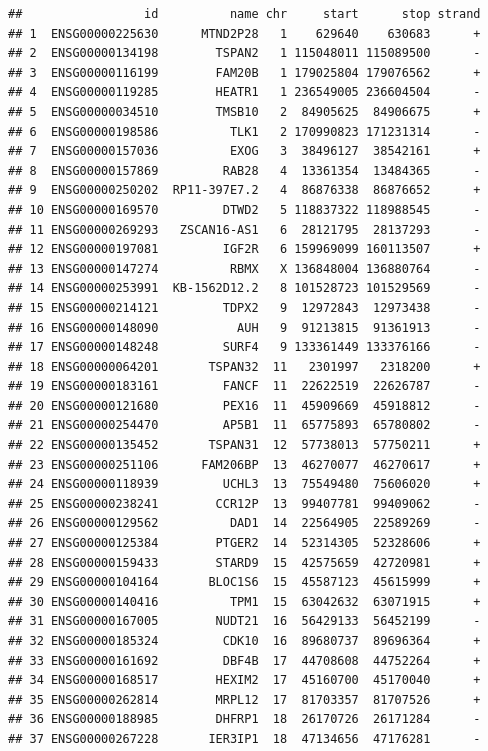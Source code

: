 \documentclass[
]{book}
\begin{document}
\begin{verbatim}
##                 id          name chr     start      stop strand
## 1  ENSG00000225630      MTND2P28   1    629640    630683      +
## 2  ENSG00000134198        TSPAN2   1 115048011 115089500      -
## 3  ENSG00000116199        FAM20B   1 179025804 179076562      +
## 4  ENSG00000119285        HEATR1   1 236549005 236604504      -
## 5  ENSG00000034510        TMSB10   2  84905625  84906675      +
## 6  ENSG00000198586          TLK1   2 170990823 171231314      -
## 7  ENSG00000157036          EXOG   3  38496127  38542161      +
## 8  ENSG00000157869         RAB28   4  13361354  13484365      -
## 9  ENSG00000250202  RP11-397E7.2   4  86876338  86876652      +
## 10 ENSG00000169570         DTWD2   5 118837322 118988545      -
## 11 ENSG00000269293   ZSCAN16-AS1   6  28121795  28137293      -
## 12 ENSG00000197081         IGF2R   6 159969099 160113507      +
## 13 ENSG00000147274          RBMX   X 136848004 136880764      -
## 14 ENSG00000253991  KB-1562D12.2   8 101528723 101529569      -
## 15 ENSG00000214121         TDPX2   9  12972843  12973438      -
## 16 ENSG00000148090           AUH   9  91213815  91361913      -
## 17 ENSG00000148248         SURF4   9 133361449 133376166      -
## 18 ENSG00000064201       TSPAN32  11   2301997   2318200      +
## 19 ENSG00000183161         FANCF  11  22622519  22626787      -
## 20 ENSG00000121680         PEX16  11  45909669  45918812      -
## 21 ENSG00000254470         AP5B1  11  65775893  65780802      -
## 22 ENSG00000135452       TSPAN31  12  57738013  57750211      +
## 23 ENSG00000251106      FAM206BP  13  46270077  46270617      +
## 24 ENSG00000118939         UCHL3  13  75549480  75606020      +
## 25 ENSG00000238241        CCR12P  13  99407781  99409062      -
## 26 ENSG00000129562          DAD1  14  22564905  22589269      -
## 27 ENSG00000125384        PTGER2  14  52314305  52328606      +
## 28 ENSG00000159433        STARD9  15  42575659  42720981      +
## 29 ENSG00000104164       BLOC1S6  15  45587123  45615999      +
## 30 ENSG00000140416          TPM1  15  63042632  63071915      +
## 31 ENSG00000167005        NUDT21  16  56429133  56452199      -
## 32 ENSG00000185324         CDK10  16  89680737  89696364      +
## 33 ENSG00000161692         DBF4B  17  44708608  44752264      +
## 34 ENSG00000168517        HEXIM2  17  45160700  45170040      +
## 35 ENSG00000262814        MRPL12  17  81703357  81707526      +
## 36 ENSG00000188985        DHFRP1  18  26170726  26171284      -
## 37 ENSG00000267228       IER3IP1  18  47134656  47176281      -

\end{verbatim}
\end{document}

